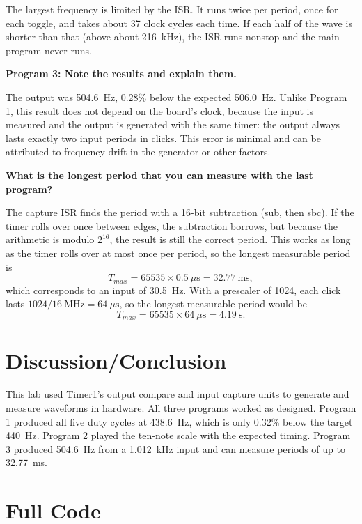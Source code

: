 \documentclass[11pt]{article}
\newcommand{\question}[1]{\par\medskip\noindent\textbf{#1}\par\noindent\ignorespaces}
\begin{document}
The largest frequency is limited by the ISR. It runs twice per period, once for each toggle, and takes about 37 clock cycles each time. If each half of the wave is shorter than that (above about 216~kHz), the ISR runs nonstop and the main program never runs.

\question{Program 3: Note the results and explain them.}
The output was 504.6~Hz, 0.28\% below the expected 506.0~Hz. Unlike Program 1, this result does not depend on the board's clock, because the input is measured and the output is generated with the same timer: the output always lasts exactly two input periods in clicks. This error is minimal and can be attributed to frequency drift in the generator or other factors.

\question{What is the longest period that you can measure with the last program?}
The capture ISR finds the period with a 16-bit subtraction (sub, then sbc). If the timer rolls over once between edges, the subtraction borrows, but because the arithmetic is modulo $2^{16}$, the result is still the correct period. This works as long as the timer rolls over at most once per period, so the longest measurable period is
\begin{equation}
  T_{max} = 65535 \times 0.5~\mu\text{s} = 32.77~\text{ms},
\end{equation}
which corresponds to an input of 30.5~Hz. With a prescaler of 1024, each click lasts $1024 / 16~\text{MHz} = 64~\mu\text{s}$, so the longest measurable period would be
\begin{equation}
  T_{max} = 65535 \times 64~\mu\text{s} = 4.19~\text{s}.
\end{equation}

\section{Discussion/Conclusion}
This lab used Timer1's output compare and input capture units to generate and measure waveforms in hardware. All three programs worked as designed. Program 1 produced all five duty cycles at 438.6~Hz, which is only 0.32\% below the target 440~Hz. Program 2 played the ten-note scale with the expected timing. Program 3 produced 504.6~Hz from a 1.012~kHz input and can measure periods of up to 32.77~ms.

\pagebreak

\appendix
\section{Full Code}
\label{app:code}
\end{document}
